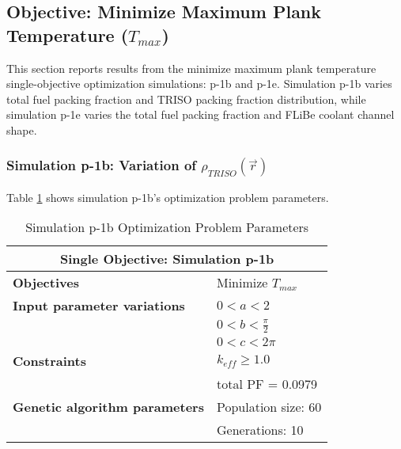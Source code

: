 \subsection{Objective: Minimize Maximum Plank Temperature ($T_{max}$)}
\label{sec:plank-1-obj-temp}
This section reports results from the minimize maximum plank temperature single-objective
optimization simulations: p-1b and p-1e. 
Simulation p-1b varies total fuel packing fraction and \gls{TRISO} packing fraction 
distribution, while simulation p-1e varies the total fuel packing fraction and 
\gls{FLiBe} coolant channel shape. 

\subsubsection{Simulation p-1b: Variation of $\rho_{TRISO}(\vec{r})$}
Table \ref{tab:simulationp1b} shows simulation p-1b's optimization problem parameters. 
\begin{table}[htbp!]
    \centering
    \onehalfspacing
    \caption{Simulation p-1b Optimization Problem Parameters}
	\label{tab:simulationp1b}
    \footnotesize
    \begin{tabular}{l|p{3cm}}
    \hline 
    \multicolumn{2}{c}{\textbf{Single Objective: Simulation p-1b}} \\
    \hline 
    \textbf{Objectives} & Minimize $T_{max}$ \\
    \hline 
    \textbf{Input parameter variations} & $0<a<2$ \\
    & $0<b<\frac{\pi}{2}$ \\
    & $0<c<2\pi$ \\
    \hline
    \textbf{Constraints} & $k_{eff} \geq 1.0$\\ 
    & total PF = 0.0979\\
    \hline 
    \textbf{Genetic algorithm parameters} & Population size: 60 \\
    & Generations: 10 \\
    \hline
    \end{tabular}
\end{table}

